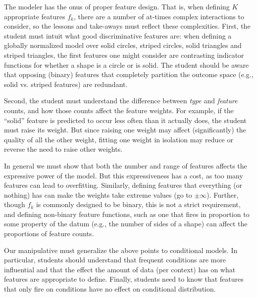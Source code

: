 \documentclass[11pt,letterpaper]{article}
\newcommand{\Data}[0]{\ensuremath{\mathcal{D}}}
\begin{document}
The modeler has the onus of proper feature design. That is, when defining $K$ 
appropriate features $f_k$, there are a number of at-times complex interactions 
to consider, so the lessons and take-aways must reflect these complexities. 
First, the student must intuit what good discriminative features are: 
when defining a globally normalized model over solid circles, striped 
circles, solid triangles and striped triangles, the first features 
one might consider are contrasting indicator functions for whether a shape
is a circle or is solid. The student should be aware that opposing (binary) features 
that completely partition the outcome space (e.g., solid vs. striped features) are redundant.

Second, the student must understand the difference between \textit{type} and 
\textit{feature} counts, and how those counts affect the feature weights. 
For example, if the “solid” feature is predicted to occur less often 
than it actually does, the student must raise its weight. But since raising one weight 
may affect (significantly) the quality of all the other weight, fitting one weight in
isolation may reduce or reverse the need to raise other weights. 

In general we must show that both the number and range of features affects the expressive 
power of the model. But this expressiveness has a cost, as too many features can lead to overfitting. 
Similarly, defining features that everything (or nothing) has can make the weights 
take extreme values (go to $\pm \infty$). Further, though $f_k$ is commonly designed to be binary, 
this is not a strict requirement, and defining non-binary feature functions, such as one that fires in 
proportion to some property of the datum (e.g., the number of sides of a shape) can affect the
proportions of feature counts.


Our manipulative must generalize the above points to conditional models. In particular, students should 
understand that frequent conditions are more influential and that the effect the amount of data 
(per context) has on what features are appropriate to define. Finally, students need to know that 
features that only fire on conditions have no effect on conditional distribution.

\end{document}
